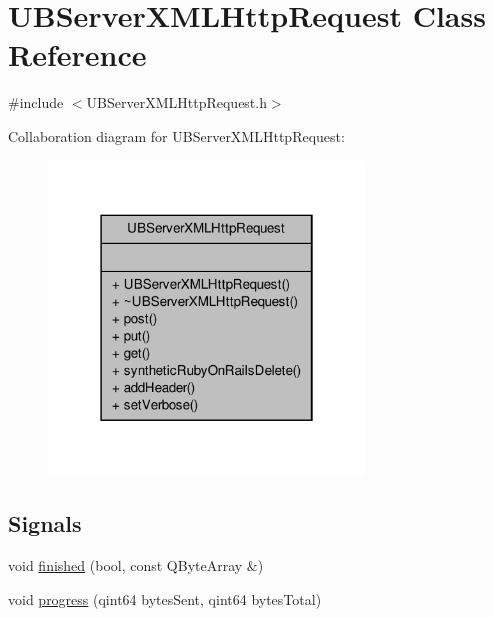 \hypertarget{class_u_b_server_x_m_l_http_request}{\section{U\-B\-Server\-X\-M\-L\-Http\-Request Class Reference}
\label{df/dbf/class_u_b_server_x_m_l_http_request}
}


{\ttfamily \#include $<$U\-B\-Server\-X\-M\-L\-Http\-Request.\-h$>$}



Collaboration diagram for U\-B\-Server\-X\-M\-L\-Http\-Request\-:
\nopagebreak
\begin{figure}[H]
\begin{center}
\leavevmode
\includegraphics[width=238pt]{de/db6/class_u_b_server_x_m_l_http_request__coll__graph}
\end{center}
\end{figure}
\subsection*{Signals}
\begin{DoxyCompactItemize}
\item 
void \hyperlink{class_u_b_server_x_m_l_http_request_a81ac4224b727ccb9fcb091c0ea533fa4}{finished} (bool, const Q\-Byte\-Array \&)
\item 
void \hyperlink{class_u_b_server_x_m_l_http_request_aff370dce4474dc4353f699a0bbb037af}{progress} (qint64 bytes\-Sent, qint64 bytes\-Total)
\end{DoxyCompactItemize}
